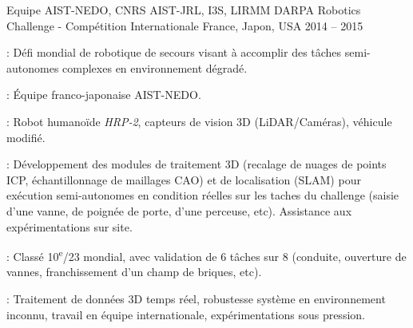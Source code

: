 \begin{cventries}
  \cventry
  {Equipe AIST-NEDO, CNRS AIST-JRL, I3S, LIRMM} %
  {DARPA Robotics Challenge - Compétition Internationale} %
  {France, Japon, USA} %
  {2014 -- 2015} %
  {
    \begin{cvitems}
    \item {} : Défi mondial de robotique de secours visant à accomplir des
      tâches semi-autonomes complexes en environnement dégradé.
    \item {} : Équipe franco-japonaise AIST-NEDO.
    \item {} : Robot humanoïde \emph{HRP-2}, capteurs de
      vision 3D (LiDAR/Caméras), véhicule modifié.
    \item {} : Développement des modules de traitement 3D (recalage de nuages de
      points ICP, échantillonnage de maillages CAO) et de localisation (SLAM) pour exécution semi-autonomes
      en condition réelles sur les taches du challenge (saisie d'une vanne, de poignée de porte, d'une
      perceuse, etc). Assistance aux expérimentations sur site.
    \item {} : Classé 10\textsuperscript{e}/23 mondial, avec validation de 6
      tâches sur 8 (conduite, ouverture de vannes, franchissement d'un champ de briques, etc).
    \item {} : Traitement de données 3D temps réel, robustesse système en
      environnement inconnu, travail en équipe internationale, expérimentations sous pression.
    \end{cvitems}
  }

\end{cventries}
